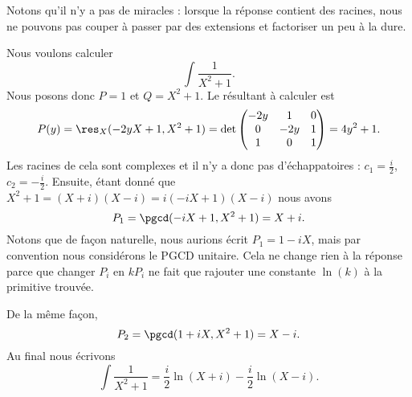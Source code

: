 Notons qu'il n'y a pas de miracles : lorsque la réponse contient des racines, nous ne pouvons pas couper à passer par des extensions et factoriser un peu à la dure.

\begin{example} \label{ExYQODuyU}
	Nous voulons calculer
	\begin{equation}
		\int\frac{ 1 }{ X^2+1 }.
	\end{equation}
	Nous posons donc \( P=1\) et \( Q=X^2+1\). Le résultant à calculer est
	\begin{subequations}
		\begin{align}
			P(y)=\res_X(-2yX+1,X^2+1)=\det\begin{pmatrix}
				                              -2y & 1   & 0 \\
				                              0   & -2y & 1 \\
				                              1   & 0   & 1
			                              \end{pmatrix}=4y^2+1.
		\end{align}
	\end{subequations}
	Les racines de cela sont complexes et il n'y a donc pas d'échappatoires : \( c_1=\frac{ i }{2}\), \( c_2=-\frac{ i }{2}\). Ensuite, étant donné que \( X^2+1=(X+i)(X-i)=i(-iX+1)(X-i)\) nous avons
	\begin{equation}
		P_1=\pgcd(-iX+1,X^2+1)=X+i.
	\end{equation}
	Notons que de façon naturelle, nous aurions écrit \( P_1=1-iX\), mais par convention nous considérons le PGCD unitaire. Cela ne change rien à la réponse parce que changer \( P_i\) en \( kP_i\) ne fait que rajouter une constante \( \ln(k)\) à la primitive trouvée.

	De la même façon,
	\begin{equation}
		P_2=\pgcd(1+iX,X^2+1)=X-i.
	\end{equation}
	Au final nous écrivons
	\begin{equation}
		\int\frac{1}{ X^2+1 }=\frac{ i }{2}\ln(X+i)-\frac{ i }{2}\ln(X-i).
	\end{equation}
\end{example}


